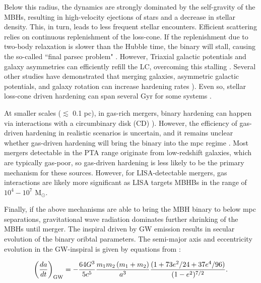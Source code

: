 \documentclass[11pt, letterpaper]{article}
\newcommand{\msun}{M$_{\odot}$}
\begin{document}
Below this radius, the dynamics are strongly dominated by the self-gravity of the MBHs, resulting in high-velocity ejections of stars and a decrease in stellar density. This, in turn, leads to less frequent stellar encounters. Efficient scattering relies on continuous replenishment of the loss-cone.  If the replenishment due to two-body relaxation is slower than the Hubble time, the binary will stall, causing the so-called ``final parsec problem" \citep{2003MerritandMilosavljevic}. However, Triaxial galactic potentials and galaxy asymmetries can efficiently refill the LC, overcoming this stalling \citep{Yu_2002}. Several other studies have demonstrated that merging galaxies, asymmetric galactic potentials, and galaxy rotation can increase hardening rates \citep{holleybockelmann2006lossconetriaxialgalaxies,berczik_2006,Holley_Bockelmann_2010,Preto_2011,Khan_2011,Holley-Bockelmann2015,Khan_2016}). Even so, stellar loss-cone driven hardening can span several Gyr for some systems \citep{Kelley_2017a}.

At smaller scales ($\lesssim$ 0.1 pc), in gas-rich mergers, binary hardening can happen via interactions with a circumbinary disk (CD) \citep{Dotti_2009,cuadra_massive_2009,nixon_tearing_2013,goicovic_infalling_2017,Siwek2023,Siwek2024}). However, the efficiency of gas-driven hardening in realistic scenarios is uncertain, and it remains unclear whether gas-driven hardening will bring the binary into the mpc regime \citep{lodato_black_2009,moody_hydrodynamic_2019,munoz_circumbinary_2020}. Most mergers detectable in the PTA range originate from low-redshift galaxies, which are typically gas-poor, so gas-driven hardening is less likely to be the primary mechanism for these sources. However, for LISA-detectable mergers, gas interactions are likely more significant as LISA targets MBHBs in the range of $10^4 - 10^7$ \msun \citep{dotti_supermassive_2007}.


Finally, if the above mechanisms are able to bring the MBH binary to below mpc separations, gravitational wave radiation dominates further shrinking of the MBHs until merger. The inspiral driven by GW emission results in secular evolution of the binary oribtal parameters. The semi-major axis and eccentricity evolution in the GW-inspiral is given by equations from \citet{Peters_1963}:

\begin{equation}
 \left(\frac{d a}{dt}\right)_{\rm GW}=-\frac{64G^3}{5c^5} \frac{m_1 m_2 \left	(m_1 +m_2\right)}{a^3} \frac{(1+ 73 e^2/24+ 37e^4/96)}
 {(1-e^2)^{7/2}}.
 \label{dadt_gw}
\end{equation}
\end{document}
